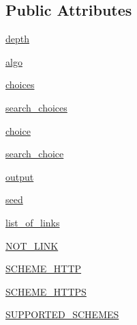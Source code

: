 \subsection*{Public Attributes}
\begin{DoxyCompactItemize}
\item 
\hyperlink{classpylinkvalidator_1_1_p_o_c_01_code_1_1_web___crawler_1_1_web___crawler_a4b25f5a1077981b4fc673a30cd6f60f5}{depth}
\item 
\hyperlink{classpylinkvalidator_1_1_p_o_c_01_code_1_1_web___crawler_1_1_web___crawler_ae21f36bb8bac5b3a440e372a6898fdb3}{algo}
\item 
\hyperlink{classpylinkvalidator_1_1_p_o_c_01_code_1_1_web___crawler_1_1_web___crawler_a17e17d066349bf6795a8f3a6a2dfc909}{choices}
\item 
\hyperlink{classpylinkvalidator_1_1_p_o_c_01_code_1_1_web___crawler_1_1_web___crawler_a33c0a83d96930b31e2a8f0f81345a18f}{search\+\_\+choices}
\item 
\hyperlink{classpylinkvalidator_1_1_p_o_c_01_code_1_1_web___crawler_1_1_web___crawler_a4100bfbd077cd54c5ee1b6e3ad21ba05}{choice}
\item 
\hyperlink{classpylinkvalidator_1_1_p_o_c_01_code_1_1_web___crawler_1_1_web___crawler_ac2c45da364f56570078463b236a3db9a}{search\+\_\+choice}
\item 
\hyperlink{classpylinkvalidator_1_1_p_o_c_01_code_1_1_web___crawler_1_1_web___crawler_a72c07e1d106dac630b27ad7844742f21}{output}
\item 
\hyperlink{classpylinkvalidator_1_1_p_o_c_01_code_1_1_web___crawler_1_1_web___crawler_a783243f26a2aa6c636626231ec137c35}{seed}
\item 
\hyperlink{classpylinkvalidator_1_1_p_o_c_01_code_1_1_web___crawler_1_1_web___crawler_ac2956f25315755df07ef3ba47f283e83}{list\+\_\+of\+\_\+links}
\item 
\hyperlink{classpylinkvalidator_1_1_p_o_c_01_code_1_1_web___crawler_1_1_web___crawler_aad9d98c171e3d7014a3eee1d061e1381}{N\+O\+T\+\_\+\+L\+I\+NK}
\item 
\hyperlink{classpylinkvalidator_1_1_p_o_c_01_code_1_1_web___crawler_1_1_web___crawler_aa8af000696c151fe4972d098507e7654}{S\+C\+H\+E\+M\+E\+\_\+\+H\+T\+TP}
\item 
\hyperlink{classpylinkvalidator_1_1_p_o_c_01_code_1_1_web___crawler_1_1_web___crawler_a6d304fcbd84982b5b7560d9f7bd9f3d4}{S\+C\+H\+E\+M\+E\+\_\+\+H\+T\+T\+PS}
\item 
\hyperlink{classpylinkvalidator_1_1_p_o_c_01_code_1_1_web___crawler_1_1_web___crawler_a917f9b86adefbcb3dc0dc53075ebbd34}{S\+U\+P\+P\+O\+R\+T\+E\+D\+\_\+\+S\+C\+H\+E\+M\+ES}
\end{DoxyCompactItemize}


